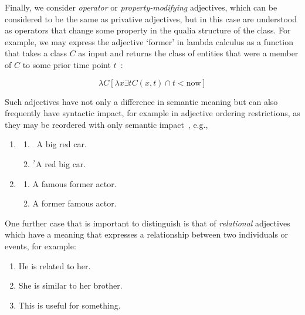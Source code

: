 \documentclass[11pt]{article}
\begin{document}
Finally, we consider \emph{operator} or \emph{property-modifying} adjectives, 
which can be considered to be the same as privative adjectives, but in this 
case are understood as operators that change some property in the qualia 
structure of the class. For example, we may express the adjective `former' 
in lambda calculus as a function that takes a class $C$ as input and returns the class 
of entities that were a member of $C$ to some prior time point $t$~\cite{partee2003there}:

$$\lambda C [\lambda x \exists t C(x,t) \cap t < \mathrm{now}]$$

Such adjectives have not only a difference in semantic meaning but can also 
frequently have syntactic impact, for example in adjective ordering 
restrictions, as they may be reordered with only semantic 
impact~\cite{teodorescu2006adjective}, e.g.,

\begin{enumerate}[resume]
\item \begin{enumerate}
\item \ A big red car.
\item $^?$A red big car.
\end{enumerate} 
\label{ex:car}
\item \begin{enumerate}
\item A famous former actor.
\item A former famous actor.
\end{enumerate}
\label{ex:actor}
\end{enumerate}

One further case that is important to distinguish is that of \emph{relational} adjectives which have a meaning 
that expresses a relationship between two individuals or events, for example:

\begin{enumerate}[resume]
\item He is related to her.
\item She is similar to her brother. 
\item This is useful for something. 
\end{enumerate}

\end{document}
